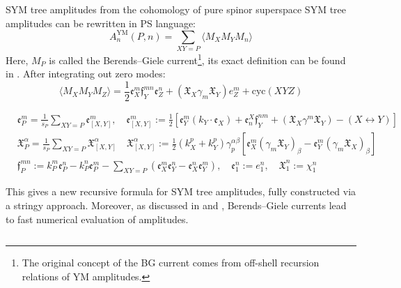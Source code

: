 \documentclass{beamer}
\begin{document}
\begin{frame}[allowframebreaks]{SYM tree amplitudes from the cohomology of pure spinor superspace}
	SYM tree amplitudes can be rewritten in PS language: \cite{Mafra:2010jq}
	\begin{equation*}
		A_{n}^{\text{YM}}(P,n)=\sum_{XY=P}\langle M_{X}M_{Y}M_{n}\rangle
	\end{equation*}
		Here, $M_P$ is called the {\color{WHU}Berends–Giele current}\footnote{The original concept of the BG current comes from off-shell recursion relations of YM amplitudes.\cite{Berends:1987me}}, its exact definition can be found in \cite{Mafra:2022wml}. After integrating out zero modes:
	\begin{equation*}
		\langle M_XM_YM_Z\rangle=\frac{1}{2}\mathfrak{e}_X^m\mathfrak{f}_Y^{mn}\mathfrak{e}_Z^n+(\mathfrak{X}_X\gamma_m\mathfrak{X}_Y)e_Z^m+\mathrm{cyc}(XYZ)
	\end{equation*}
	\begin{small}
	\begin{equation*}
		\begin{aligned}
			&\mathfrak{e}_{P}^{m}=\frac{1}{s_{P}}\sum_{XY=P}\mathfrak{e}_{[X,Y]}^{m},\quad
			\mathfrak{e}_{[X,Y]}^{m}:=\frac{1}{2}\left[\mathfrak{e}_{Y}^{m}(k_{Y}\cdot\mathfrak{e}_{X})+\mathfrak{e}_{n}^{X}\mathfrak{f}_{Y}^{nm}+(\mathfrak{X}_{X}\gamma^{m}\mathfrak{X}_{Y})-(X\leftrightarrow Y)\right]\\
			&\mathfrak{X}_{P}^{\alpha}=\frac{1}{s_{P}}\sum_{XY=P}\mathfrak{X}_{[X,Y]}^{\alpha}\quad
			\mathfrak{X}_{[X,Y]}^{\alpha}:=\frac{1}{2}(k_{X}^{p}+k_{Y}^{p})\gamma_{p}^{\alpha\beta}\left[\mathfrak{e}_{X}^{m}(\gamma_{m}\mathfrak{X}_{Y})_{\beta}-\mathfrak{e}_{Y}^{m}(\gamma_{m}\mathfrak{X}_{X})_{\beta}\right]\\
			&\mathfrak{f}_{P}^{mn}:=k_{P}^{m}\mathfrak{e}_{P}^{n}-k_{P}^{n}\mathfrak{e}_{P}^{m}-\sum_{XY=P}(\mathfrak{e}_{X}^{m}\mathfrak{e}_{Y}^{n}-\mathfrak{e}_{X}^{n}\mathfrak{e}_{Y}^{m}),\quad \mathfrak{e}_1^n := e_1^n,\quad\mathfrak{X}_1^n:=\chi_1^n
		\end{aligned}
	\end{equation*}
	\end{small}
	This gives a new recursive formula for SYM tree amplitudes, fully constructed via a {\color{WHU}stringy approach}. Moreover, as discussed in \cite{Badger:2012uz} and \cite{Giele:2010ks}, Berends–Giele currents lead to fast numerical evaluation of amplitudes.
	\begin{columns}[b] %

\end{columns}
\end{frame}
\end{document}
